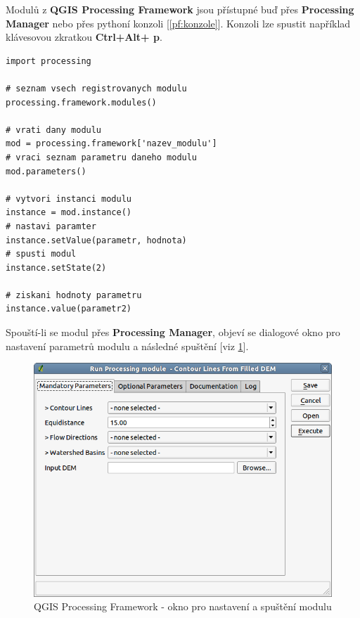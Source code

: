 Modulů z \textbf{QGIS Processing Framework} jsou přístupné buď přes \textbf{Processing Manager} nebo přes pythoní konzoli [\autoref{pf:konzole}]. Konzoli lze spustit například klávesovou zkratkou \textbf{Ctrl+Alt+ p}. 
\newpage

\begin{lstlisting}[label=pf:konzole,caption={Přístup k modulům přes konzoli.}] 
import processing

# seznam vsech registrovanych modulu
processing.framework.modules()
	
# vrati dany modulu
mod = processing.framework['nazev_modulu']
# vraci seznam parametru daneho modulu
mod.parameters()

# vytvori instanci modulu
instance = mod.instance()
# nastavi paramter
instance.setValue(parametr, hodnota)
# spusti modul
instance.setState(2)

# ziskani hodnoty parametru
instance.value(parametr2)
\end{lstlisting}

Spouští-li se modul přes \textbf{Processing Manager}, objeví se dialogové okno pro nastavení parametrů modulu a následné spuštění [viz \figurename \ref{pf:dialog}].

\begin{figure}[!]
	\centering
	\includegraphics[scale=0.5]{pictures/pf/processing_dialog}
	\caption{QGIS Processing Framework - okno pro nastavení a spuštění modulu}
  	\label{pf:dialog}
\end{figure}

\newpage
